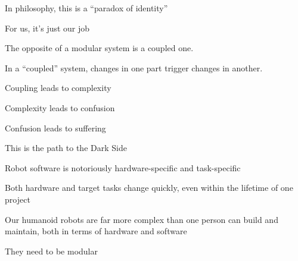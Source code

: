 In philosophy, this is a ``paradox of identity''

For us, it's just our job


The opposite of a modular system is a coupled one.

In a ``coupled'' system, changes in one part trigger changes in another.

Coupling leads to complexity

Complexity leads to confusion

Confusion leads to suffering

This is the path to the Dark Side

Robot software is notoriously hardware-specific and task-specific

Both hardware and target tasks change quickly, even within the
lifetime of one project

Our humanoid robots are far more complex than one person can build and
maintain, both in terms of hardware and software

They need to be modular


